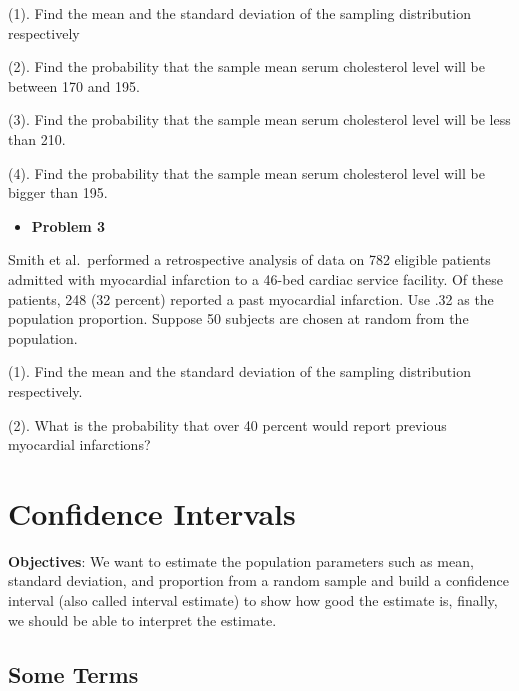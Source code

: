 \documentclass[
]{book}
\providecommand{\tightlist}{%
  \setlength{\itemsep}{0pt}\setlength{\parskip}{0pt}}
\begin{document}
(1). Find the mean and the standard deviation of the sampling distribution respectively

(2). Find the probability that the sample mean serum cholesterol level will be between 170 and 195.

(3). Find the probability that the sample mean serum cholesterol level will be less than 210.

(4). Find the probability that the sample mean serum cholesterol level will be bigger than 195.

\begin{itemize}
\tightlist
\item
  \textbf{Problem 3}
\end{itemize}

Smith et al.~performed a retrospective analysis of data on 782 eligible patients admitted with
myocardial infarction to a 46-bed cardiac service facility. Of these patients, 248 (32 percent) reported a past myocardial infarction. Use .32 as the population proportion. Suppose 50 subjects are chosen at random from the population.

(1). Find the mean and the standard deviation of the sampling distribution respectively.

(2). What is the probability that over 40 percent would report previous myocardial infarctions?

\hypertarget{confidence-intervals}{%
\chapter{Confidence Intervals}\label{confidence-intervals}}

\textbf{Objectives}: We want to estimate the population parameters such as mean, standard deviation, and proportion from a random sample and build a confidence interval (also called interval estimate) to show how good the estimate is, finally, we should be able to interpret the estimate.

\hypertarget{some-terms}{%
\section{Some Terms}\label{some-terms}}
\end{document}
